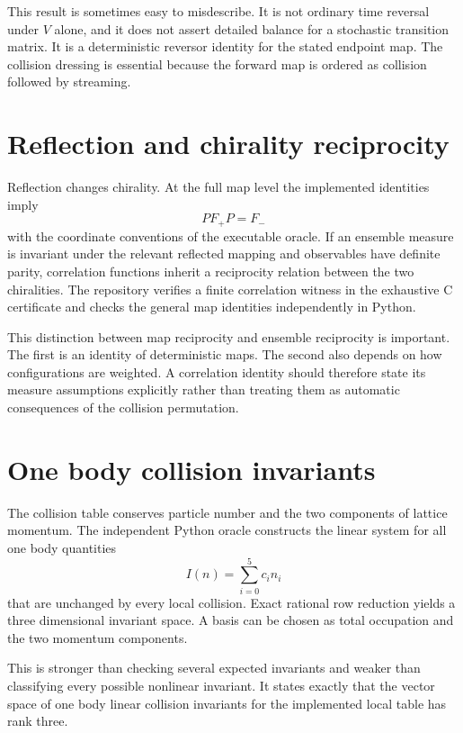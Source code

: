 This result is sometimes easy to misdescribe. It is not ordinary time reversal under $V$ alone, and it does not assert detailed balance for a stochastic transition matrix. It is a deterministic reversor identity for the stated endpoint map. The collision dressing is essential because the forward map is ordered as collision followed by streaming.

\section{Reflection and chirality reciprocity}
Reflection changes chirality. At the full map level the implemented identities imply
\begin{equation}
 P F_{+} P=F_{-}
 \label{eq:full_mirror}
\end{equation}
with the coordinate conventions of the executable oracle. If an ensemble measure is invariant under the relevant reflected mapping and observables have definite parity, correlation functions inherit a reciprocity relation between the two chiralities. The repository verifies a finite correlation witness in the exhaustive C certificate and checks the general map identities independently in Python.

This distinction between map reciprocity and ensemble reciprocity is important. The first is an identity of deterministic maps. The second also depends on how configurations are weighted. A correlation identity should therefore state its measure assumptions explicitly rather than treating them as automatic consequences of the collision permutation.

\section{One body collision invariants}
The collision table conserves particle number and the two components of lattice momentum. The independent Python oracle constructs the linear system for all one body quantities
\begin{equation}
 I(n)=\sum_{i=0}^{5}c_i n_i
 \label{eq:onebody_general}
\end{equation}
that are unchanged by every local collision. Exact rational row reduction yields a three dimensional invariant space. A basis can be chosen as total occupation and the two momentum components.

This is stronger than checking several expected invariants and weaker than classifying every possible nonlinear invariant. It states exactly that the vector space of one body linear collision invariants for the implemented local table has rank three.

